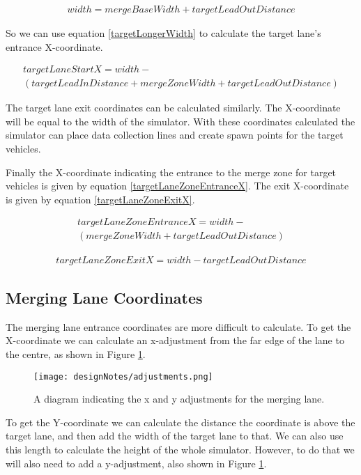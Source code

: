 \begin{multline}\label{mergeLongerWidth}
width = mergeBaseWidth + targetLeadOutDistance
\end{multline}

So we can use equation \ref{targetLongerWidth} to calculate the target lane's entrance X-coordinate.

\begin{multline}\label{targetLaneStartX}
targetLaneStartX = width - \\
(targetLeadInDistance + mergeZoneWidth + targetLeadOutDistance)
\end{multline}

The target lane exit coordinates can be calculated similarly. The X-coordinate will be equal to the width of the simulator. With these coordinates calculated the simulator can place data collection lines and create spawn points for the target vehicles.

Finally the X-coordinate indicating the entrance to the merge zone for target vehicles is given by equation \ref{targetLaneZoneEntranceX}. The exit X-coordinate is given by equation \ref{targetLaneZoneExitX}.

\begin{multline}\label{targetLaneZoneEntranceX}
targetLaneZoneEntranceX = width - \\
(mergeZoneWidth + targetLeadOutDistance)
\end{multline}

\begin{multline}\label{targetLaneZoneExitX}
targetLaneZoneExitX = width - targetLeadOutDistance
\end{multline}

\subsection{Merging Lane Coordinates}
\label{subsec:Merging Lane Coordinates}
The merging lane entrance coordinates are more difficult to calculate. To get the X-coordinate we can calculate an x-adjustment from the far edge of the lane to the centre, as shown in Figure \ref{fig:adjustments}.

\begin{figure}[htb]
\texttt{[image: designNotes/adjustments.png]}
\caption{A diagram indicating the x and y adjustments for the merging lane.}
\label{fig:adjustments}
\end{figure}

To get the Y-coordinate we can calculate the distance the coordinate is above the target lane, and then add the width of the target lane to that. We can also use this length to calculate the height of the whole simulator. However, to do that we will also need to add a y-adjustment, also shown in Figure \ref{fig:adjustments}.

